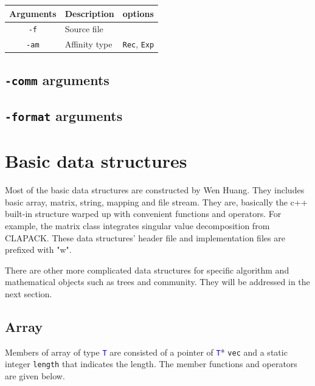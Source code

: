 \documentclass[11pt,a4paper]{article}
\newcommand{\ttype}[1]{\textcolor{blue}{\texttt{#1}}}
\theoremstyle{definition}
\theoremstyle{definition}
\numberwithin{equation}{section}
\begin{document}
	
	\begin{table}[!h]
		\centering
		\begin{tabular}{cll}
			\hline
			Arguments & Description & options\\
			\hline
			\texttt{-f}& Source file &  \\
			\hline
			\texttt{-am}& Affinity type & \texttt{Rec}, \texttt{Exp}\\
			\hline
		\end{tabular}
	\end{table}
	
	\subsection{\texttt{-comm} arguments}
	
	\subsection{\texttt{-format} arguments}
	
	
	
	\section{Basic data structures}
	
	Most of the basic data structures are constructed by Wen Huang. They includes basic array, matrix, string, mapping and file stream. They are, basically the c++ built-in structure warped up with convenient functions and operators. For example, the matrix class integrates singular value decomposition from CLAPACK. These data structures' header file and implementation files are prefixed with "w".
	
	There are other more complicated data structures for specific algorithm and mathematical objects such as trees and community. They will be addressed in the next section. 
	
	\subsection{Array}
	
	Members of array of type \ttype{T} are consisted of a pointer of \ttype{T}* \texttt{vec} and a static integer \texttt{length} that indicates the length. The member functions and operators are given below.
	
\end{document}
